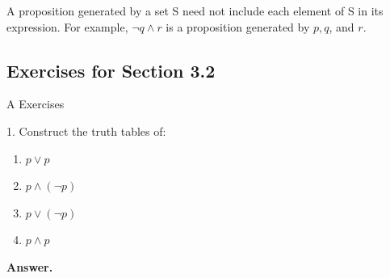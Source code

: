 \documentclass[10pt,]{book}
\theoremstyle{plain}
\theoremstyle{definition}
\theoremstyle{definition}
\theoremstyle{definition}
\theoremstyle{definition}
\begin{document}
\par
A proposition generated by a set S need not include each element of S in its expression. For example, \(\neg q \land  r\) is a proposition generated  by \(p, q\), and \(r\).%
\typeout{************************************************}
\typeout{************************************************}
\subsection[Exercises for Section 3.2 ]{Exercises for Section 3.2 }\label{exercises-3.2}
\hypertarget{exercisegroup-2}{}\typeout{************************************************}
\typeout{************************************************}
A Exercises%
\begin{exercisegroup}
\item[1.]\hypertarget{exercise-6}{}Construct the truth tables of:%
\par
\leavevmode%
\begin{enumerate}[label=\alph*]
\item\hypertarget{li-58}{} \(p\lor p\) %
\item\hypertarget{li-59}{} \(p\land (\neg p)\)  %
\item\hypertarget{li-60}{} \(p\lor (\neg p)\) %
\item\hypertarget{li-61}{}  \(p \land p\) %
\end{enumerate}
\par\smallskip
\par\smallskip
\noindent\textbf{Answer.}\hypertarget{answer-4}{}\quad
\leavevmode%
\end{exercisegroup}
\end{document}
